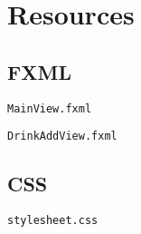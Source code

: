 

\section{Resources}

\subsection{FXML}

\verb|MainView.fxml|



\verb|DrinkAddView.fxml|



\subsection{CSS}

\verb|stylesheet.css|

